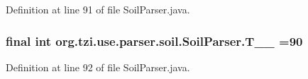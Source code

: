 Definition at line 91 of file Soil\-Parser.\-java.

\hypertarget{classorg_1_1tzi_1_1use_1_1parser_1_1soil_1_1_soil_parser_aa6cf583640eeea0158b643296acef0ee}{
\subsubsection[{T\-\_\-\-\_\-90}]{\setlength{\rightskip}{0pt plus 5cm}final int org.\-tzi.\-use.\-parser.\-soil.\-Soil\-Parser.\-T\-\_\-\-\_ =90\hspace{0.3cm}{\ttfamily [static]}}}\label{classorg_1_1tzi_1_1use_1_1parser_1_1soil_1_1_soil_parser_aa6cf583640eeea0158b643296acef0ee}


Definition at line 92 of file Soil\-Parser.\-java.

